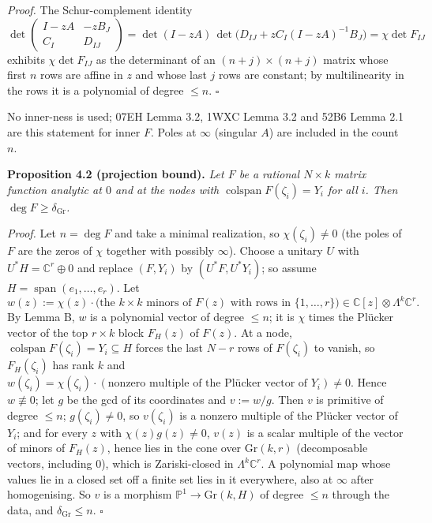 \documentclass[
  11pt,
  a4paper,
]{article}
\begin{document}
\emph{Proof.} The Schur-complement identity
\[\det\begin{pmatrix}I-zA&-zB_J\\ C_I&D_{IJ}\end{pmatrix}=\det(I-zA)\,\det\bigl(D_{IJ}+zC_I(I-zA)^{-1}B_J\bigr)=\chi\det F_{IJ}\]
exhibits \(\chi\det F_{IJ}\) as the determinant of an
\((n+j)\times(n+j)\) matrix whose first \(n\) rows are affine in \(z\)
and whose last \(j\) rows are constant; by multilinearity in the rows it
is a polynomial of degree \(\le n\). \(\square\)

No inner-ness is used; 07EH Lemma 3.2, 1WXC Lemma 3.2 and 52B6 Lemma 2.1
are this statement for inner \(F\). Poles at \(\infty\) (singular \(A\))
are included in the count \(n\).

\textbf{Proposition 4.2 (projection bound).} \emph{Let \(F\) be a
rational \(N\times k\) matrix function analytic at \(0\) and at the
nodes with \(\operatorname{colspan}F(\zeta_i)=Y_i\) for all \(i\). Then
\(\deg F\ge\delta_{\mathrm{Gr}}\).}

\emph{Proof.} Let \(n=\deg F\) and take a minimal realization, so
\(\chi(\zeta_i)\ne0\) (the poles of \(F\) are the zeros of \(\chi\)
together with possibly \(\infty\)). Choose a unitary \(U\) with
\(U^*H=\mathbb C^r\oplus0\) and replace \((F,\allowbreak{}Y_i)\) by
\((U^*F,\allowbreak{}U^*Y_i)\); so assume \(H=\operatorname{span}(e_1,\allowbreak{}\dots,\allowbreak{}e_r)\).
Let
\[w(z):=\chi(z)\cdot\bigl(\text{the }k\times k\text{ minors of }F(z)\text{ with rows in }\{1,\dots,r\}\bigr)\in\mathbb C[z]\otimes\Lambda^k\mathbb C^r .\]
By Lemma B, \(w\) is a polynomial vector of degree \(\le n\); it is
\(\chi\) times the Plücker vector of the top \(r\times k\) block
\(F_H(z)\) of \(F(z)\). At a node,
\(\operatorname{colspan}F(\zeta_i)=Y_i\subseteq H\) forces the last
\(N-r\) rows of \(F(\zeta_i)\) to vanish, so \(F_H(\zeta_i)\) has rank
\(k\) and
\(w(\zeta_i)=\chi(\zeta_i)\cdot(\text{nonzero multiple of the Plücker vector of }Y_i)\ne0\).
Hence \(w\not\equiv0\); let \(g\) be the gcd of its coordinates and
\(v:=w/g\). Then \(v\) is primitive of degree \(\le n\);
\(g(\zeta_i)\ne0\), so \(v(\zeta_i)\) is a nonzero multiple of the
Plücker vector of \(Y_i\); and for every \(z\) with \(\chi(z)g(z)\ne0\),
\(v(z)\) is a scalar multiple of the vector of minors of \(F_H(z)\),
hence lies in the cone over \(\mathrm{Gr}(k,\allowbreak{}r)\) (decomposable vectors,
including \(0\)), which is Zariski-closed in \(\Lambda^k\mathbb C^r\). A
polynomial map whose values lie in a closed set off a finite set lies in
it everywhere, also at \(\infty\) after homogenising. So \(v\) is a
morphism \(\mathbb P^1\to\mathrm{Gr}(k,\allowbreak{}H)\) of degree \(\le n\) through
the data, and \(\delta_{\mathrm{Gr}}\le n\). \(\square\)
\end{document}
